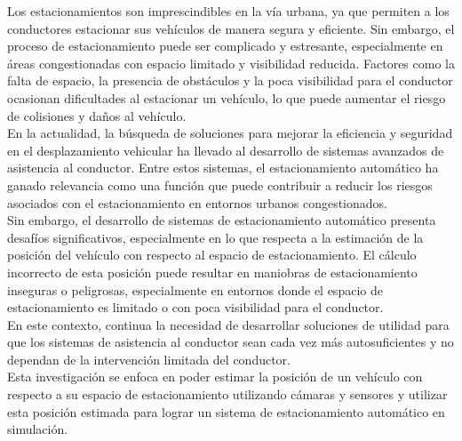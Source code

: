 \noindent
Los estacionamientos son imprescindibles en la vía urbana, ya que permiten a los conductores estacionar sus vehículos
de manera segura y eficiente. Sin embargo, el proceso de estacionamiento puede ser complicado y estresante,
especialmente en áreas congestionadas con espacio limitado y visibilidad reducida.
Factores como la falta de espacio, la presencia de obstáculos y la poca visibilidad para el conductor ocasionan
dificultades al estacionar un vehículo, lo que puede aumentar el riesgo de colisiones y daños al vehículo.
\\
En la actualidad, la búsqueda de soluciones para mejorar la eficiencia y seguridad en el desplazamiento vehicular
ha llevado al desarrollo de sistemas avanzados de asistencia al conductor.
Entre estos sistemas, el estacionamiento automático ha ganado relevancia como una función que puede contribuir
a reducir los riesgos asociados con el estacionamiento en entornos urbanos congestionados.
\\
Sin embargo, el desarrollo de sistemas de estacionamiento automático presenta desafíos significativos,
especialmente en lo que respecta a la estimación de la posición del vehículo con respecto al espacio de estacionamiento.
El cálculo incorrecto de esta posición puede resultar en maniobras de estacionamiento inseguras o peligrosas,
especialmente en entornos donde el espacio de estacionamiento es limitado o con poca visibilidad para el conductor.
\\
En este contexto, continua la necesidad de desarrollar soluciones de utilidad para que los sistemas de asistencia al conductor
sean cada vez más autosuficientes y no dependan de la intervención limitada del conductor.
\\
Esta investigación se enfoca en poder estimar la posición de un vehículo con respecto a su espacio de estacionamiento
utilizando cámaras y sensores y utilizar esta posición estimada para lograr un sistema de estacionamiento automático en simulación.